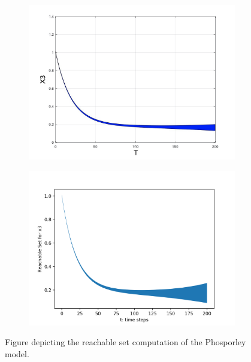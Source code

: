 \documentclass[EPiC]{easychair}
\begin{document}
\begin{figure}[h]
    \hspace{-12ex}
    \begin{subfigure}{0.6\textwidth}
    \centering
    \includegraphics[width=1.15\textwidth]{SapoFigures/Phos/SapoPhos_X3.jpg}
    \end{subfigure}
    \begin{subfigure}{0.6\textwidth}
    \centering
    \includegraphics[width=1.12\textwidth]{SapoFigures/Phos/KaaPhos_X3.png}
    \end{subfigure}
    
    \caption{Figure depicting the reachable set computation of the Phosporley model.} 
    \label{fig3}
\end{figure}
\end{document}
